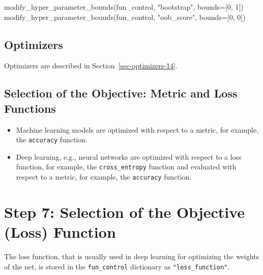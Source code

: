 \documentclass[
  letterpaper,
  DIV=11,
  numbers=noendperiod]{scrreprt}
\newenvironment{Shaded}{\begin{snugshade}}{\end{snugshade}}
\newcommand{\DecValTok}[1]{\textcolor[rgb]{0.68,0.00,0.00}{#1}}
\newcommand{\NormalTok}[1]{\textcolor[rgb]{0.00,0.23,0.31}{#1}}
\newcommand{\OperatorTok}[1]{\textcolor[rgb]{0.37,0.37,0.37}{#1}}
\newcommand{\StringTok}[1]{\textcolor[rgb]{0.13,0.47,0.30}{#1}}
\providecommand{\tightlist}{%
  \setlength{\itemsep}{0pt}\setlength{\parskip}{0pt}}\usepackage{longtable,booktabs,array}
\begin{document}
\begin{Shaded}
\begin{Highlighting}[]
\NormalTok{modify\_hyper\_parameter\_bounds(fun\_control, }\StringTok{"bootstrap"}\NormalTok{, bounds}\OperatorTok{=}\NormalTok{[}\DecValTok{0}\NormalTok{, }\DecValTok{1}\NormalTok{])}
\NormalTok{modify\_hyper\_parameter\_bounds(fun\_control, }\StringTok{"oob\_score"}\NormalTok{, bounds}\OperatorTok{=}\NormalTok{[}\DecValTok{0}\NormalTok{, }\DecValTok{0}\NormalTok{])}
\end{Highlighting}
\end{Shaded}

\hypertarget{sec-optimizers-16}{%
\subsection{Optimizers}\label{sec-optimizers-16}}

Optimizers are described in Section~\ref{sec-optimizers-14}.

\hypertarget{selection-of-the-objective-metric-and-loss-functions}{%
\subsection{Selection of the Objective: Metric and Loss
Functions}\label{selection-of-the-objective-metric-and-loss-functions}}

\begin{itemize}
\tightlist
\item
  Machine learning models are optimized with respect to a metric, for
  example, the \texttt{accuracy} function.
\item
  Deep learning, e.g., neural networks are optimized with respect to a
  loss function, for example, the \texttt{cross\_entropy} function and
  evaluated with respect to a metric, for example, the \texttt{accuracy}
  function.
\end{itemize}

\hypertarget{step-7-selection-of-the-objective-loss-function-2}{%
\section{Step 7: Selection of the Objective (Loss)
Function}\label{step-7-selection-of-the-objective-loss-function-2}}

The loss function, that is usually used in deep learning for optimizing
the weights of the net, is stored in the \texttt{fun\_control}
dictionary as \texttt{"loss\_function"}.
\end{document}
